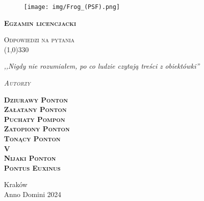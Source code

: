 \begin{titlepage} 
    \begin{center}
         \begin{figure}[H]
            \centering
            \texttt{[image: img/Frog\_(PSF).png]}
           
        \end{figure}
        
        \Huge
        \textbf{\textsc{Egzamin licencjacki}}
        
        \vspace{0.5cm}
        \Large
        \textsc{Odpowiedzi na pytania} \\ 
        \line(1,0){330}

        \normalsize
        \textit{,,Nigdy nie rozumiałem, po co ludzie czytają treści z obiektówki''}
        \vspace{1cm}

        \textit{\textsc{Autorzy}}\\
        \vspace{5mm}
  
        \textbf{\textsc{Dziurawy Ponton} \\ \textsc{Załatany Ponton} \\ \textsc{Puchaty Pompon} \\ \textsc{Zatopiony Ponton} \\ \textsc{Tonący Ponton}\\ \textsc{V} \\ \textsc{Nijaki Ponton} \\ \textsc{Pontus Euxinus}} \\
 
        \vfill

        Kraków \\
        Anno Domini 2024
    \end{center}
\end{titlepage}
